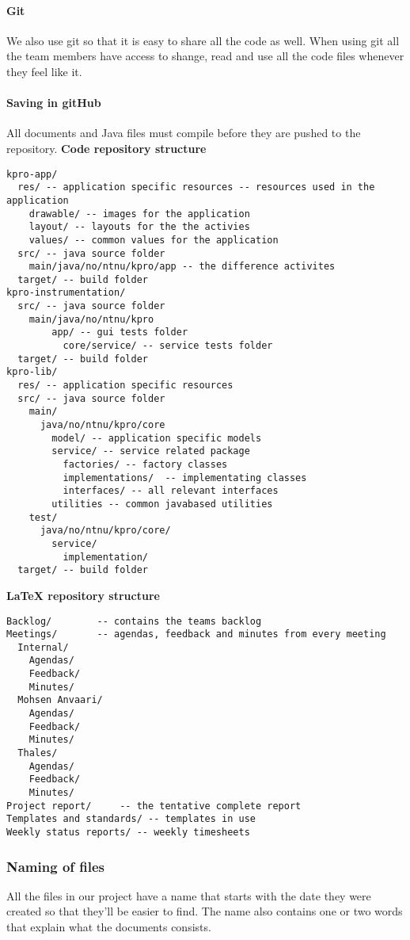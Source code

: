 \paragraph{Git}\hfill 
We also use git so that it is easy to share all the code as well. When using git all the team members have access to shange, read and use all the code files whenever they feel like it.

\paragraph{Saving in gitHub}
All documents and Java files must compile before they are pushed to the repository.\newline
\textbf{Code repository structure}
\begin{verbatim}
kpro-app/
  res/ -- application specific resources -- resources used in the application
    drawable/ -- images for the application
    layout/ -- layouts for the the activies
    values/ -- common values for the application
  src/ -- java source folder
    main/java/no/ntnu/kpro/app -- the difference activites
  target/ -- build folder
kpro-instrumentation/
  src/ -- java source folder
    main/java/no/ntnu/kpro
	    app/ -- gui tests folder
		  core/service/ -- service tests folder
  target/ -- build folder
kpro-lib/
  res/ -- application specific resources
  src/ -- java source folder
    main/
      java/no/ntnu/kpro/core
        model/ -- application specific models
        service/ -- service related package
          factories/ -- factory classes
          implementations/  -- implementating classes
          interfaces/ -- all relevant interfaces
        utilities -- common javabased utilities
    test/
      java/no/ntnu/kpro/core/
        service/
          implementation/
  target/ -- build folder

\end{verbatim}
\textbf{LaTeX repository structure}
\begin{verbatim}
Backlog/		-- contains the teams backlog
Meetings/		-- agendas, feedback and minutes from every meeting
  Internal/
    Agendas/
    Feedback/
    Minutes/
  Mohsen Anvaari/
    Agendas/
    Feedback/
    Minutes/
  Thales/
    Agendas/
    Feedback/
    Minutes/
Project report/		-- the tentative complete report
Templates and standards/ -- templates in use
Weekly status reports/ -- weekly timesheets

\end{verbatim}


\subsubsection{Naming of files}
All the files in our project have a name that starts with the date they were created so that they’ll be easier to find. The name also contains one or two words that explain what the documents consists.

